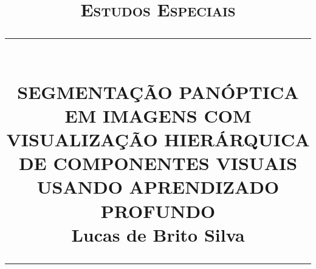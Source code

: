 \newcommand{\HRule}[1]{\rule{\linewidth}{#1}}
\begin{titlepage}
    \title{
        \normalsize  \textsc{Estudos Especiais} \\ [2.0cm]
		\HRule{0.5pt} \\  [0.75cm]
		\LARGE \textbf{\uppercase{SEGMENTAÇÃO PANÓPTICA EM IMAGENS COM VISUALIZAÇÃO HIERÁRQUICA DE COMPONENTES VISUAIS USANDO APRENDIZADO PROFUNDO}} \\ [1.3cm]
		\large \textbf{Lucas de Brito Silva} \\ [0.5cm]
		\HRule{1.5pt} \\ [0.5cm]
		\normalsize \vspace*{5\baselineskip}
	}

	\date{}

    \maketitle
    \thispagestyle{empty}
\end{titlepage}